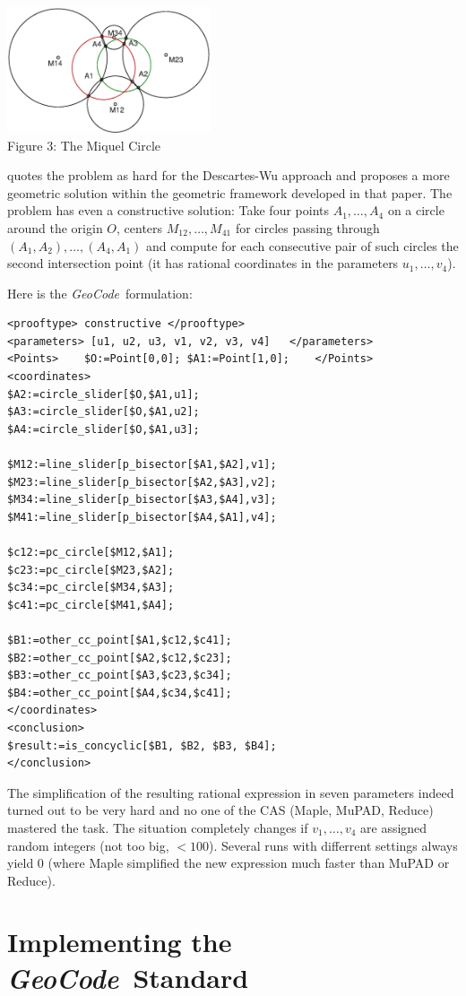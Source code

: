 \documentclass[11pt]{article}
\newcommand{\GC}{\textit{Geo\-Code}}
\begin{document}
\parbox[b]{7cm}{\centering\includegraphics[width=6cm]{linz-02/Miquel.eps}\\
  Figure 3: The Miquel Circle\vskip10pt}\hfill
\parbox[b]{8cm}{
\cite{Li_99a} quotes the problem as hard for the Descartes-Wu approach and
proposes a more geometric solution within the geometric framework developed in
that paper.  The problem has even a constructive solution: Take four points
$A_1,\ldots,A_4$ on a circle around the origin $O$, centers
$M_{12},\ldots,M_{41}$ for circles passing through
$(A_1,A_2),\ldots,(A_4,A_1)$ and compute for each consecutive pair of such
circles the second intersection point (it has rational coordinates in the
parameters $u_1,\ldots,v_4$). } Here is the \GC\ formulation:
\begin{verbatim}
<prooftype> constructive </prooftype>
<parameters> [u1, u2, u3, v1, v2, v3, v4]   </parameters>
<Points>    $O:=Point[0,0]; $A1:=Point[1,0];    </Points>
<coordinates>
$A2:=circle_slider[$O,$A1,u1];
$A3:=circle_slider[$O,$A1,u2];
$A4:=circle_slider[$O,$A1,u3];

$M12:=line_slider[p_bisector[$A1,$A2],v1];
$M23:=line_slider[p_bisector[$A2,$A3],v2];
$M34:=line_slider[p_bisector[$A3,$A4],v3];
$M41:=line_slider[p_bisector[$A4,$A1],v4];

$c12:=pc_circle[$M12,$A1];
$c23:=pc_circle[$M23,$A2];
$c34:=pc_circle[$M34,$A3];
$c41:=pc_circle[$M41,$A4];

$B1:=other_cc_point[$A1,$c12,$c41];
$B2:=other_cc_point[$A2,$c12,$c23];
$B3:=other_cc_point[$A3,$c23,$c34];
$B4:=other_cc_point[$A4,$c34,$c41];
</coordinates>
<conclusion>
$result:=is_concyclic[$B1, $B2, $B3, $B4];
</conclusion>
\end{verbatim}
The simplification of the resulting rational expression in seven parameters
indeed turned out to be very hard and no one of the CAS (Maple, MuPAD, Reduce)
mastered the task.  The situation completely changes if $v_1,\ldots,v_4$ are
assigned random integers (not too big, $<100$). Several runs with differrent
settings always yield 0 (where Maple simplified the new expression much faster
than MuPAD or Reduce).

\section{Implementing the \GC\ Standard} 
\end{document}

